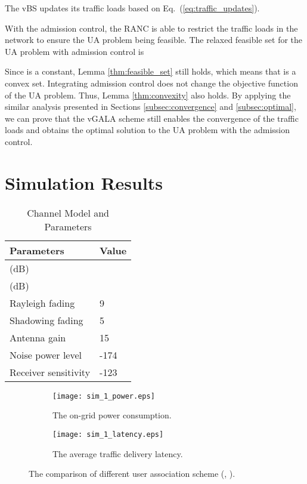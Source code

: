 \documentclass[journal]{IEEEtran}
\theoremstyle{definition}
\begin{document}
The vBS updates its traffic loads based on Eq.~(\ref{eq:traffic_updates}).

With the admission control, the RANC is able to restrict the traffic loads in the network to ensure the UA problem being feasible. The relaxed feasible set for the UA problem with admission control is

Since  is a constant, Lemma \ref{thm:feasible_set} still holds, which means that  is a convex set. Integrating admission control does not change the objective function of the UA problem. Thus, Lemma \ref{thm:convexity} also holds. By applying the similar analysis presented in Sections \ref{subsec:convergence} and \ref{subsec:optimal}, we can prove that the vGALA scheme still enables the convergence of the traffic loads and obtains the optimal solution to the UA problem with the admission control.




\section{Simulation Results}
\label{sec:simulation}

\begin{table}[ht]
\caption{Channel Model and Parameters}
\centering
\begin{tabular}{l||l}
\hline
Parameters & Value\\
\hline
 (dB) & \\
 (dB) &  \\
Rayleigh fading & 9 \\
Shadowing fading & 5  \\
Antenna gain & 15 \\
Noise power level & -174  \\
Receiver sensitivity & -123  \\
\hline
\end{tabular}
\label{table:sim_parameters}
\end{table}



\begin{figure*}[ht]
\centering
\hspace*{\fill}
    \begin{subfigure}[b]{0.5\textwidth}
            \texttt{[image: sim\_1\_power.eps]}
            \caption{The on-grid power consumption.}
            \label{fig:sim_1_power}
    \end{subfigure}\begin{subfigure}[b]{0.5\textwidth}
            \texttt{[image: sim\_1\_latency.eps]}
            \caption{The average traffic delivery latency.}
            \label{fig:sim_1_latency}
   \end{subfigure}\hfill
   \caption{The comparison of different user association scheme (, ).
     }\label{fig:sim_1_power_latency}
\end{figure*}
\end{document}
